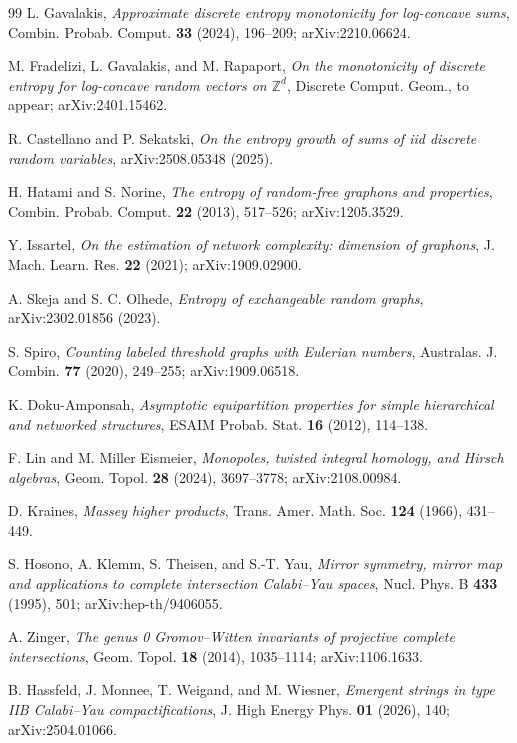 \documentclass[11pt]{article}
\theoremstyle{definition}
\begin{document}
\begin{thebibliography}{99}
 L. Gavalakis, \emph{Approximate discrete entropy monotonicity for log-concave sums}, Combin. Probab. Comput. \textbf{33} (2024), 196--209; arXiv:2210.06624.

 M. Fradelizi, L. Gavalakis, and M. Rapaport, \emph{On the monotonicity of discrete entropy for log-concave random vectors on $\mathbb Z^d$}, Discrete Comput. Geom., to appear; arXiv:2401.15462.

 R. Castellano and P. Sekatski, \emph{On the entropy growth of sums of iid discrete random variables}, arXiv:2508.05348 (2025).

 H. Hatami and S. Norine, \emph{The entropy of random-free graphons and properties}, Combin. Probab. Comput. \textbf{22} (2013), 517--526; arXiv:1205.3529.

 Y. Issartel, \emph{On the estimation of network complexity: dimension of graphons}, J. Mach. Learn. Res. \textbf{22} (2021); arXiv:1909.02900.

 A. Skeja and S. C. Olhede, \emph{Entropy of exchangeable random graphs}, arXiv:2302.01856 (2023).

 S. Spiro, \emph{Counting labeled threshold graphs with Eulerian numbers}, Australas. J. Combin. \textbf{77} (2020), 249--255; arXiv:1909.06518.

 K. Doku-Amponsah, \emph{Asymptotic equipartition properties for simple hierarchical and networked structures}, ESAIM Probab. Stat. \textbf{16} (2012), 114--138.

 F. Lin and M. Miller Eismeier, \emph{Monopoles, twisted integral homology, and Hirsch algebras}, Geom. Topol. \textbf{28} (2024), 3697--3778; arXiv:2108.00984.

 D. Kraines, \emph{Massey higher products}, Trans. Amer. Math. Soc. \textbf{124} (1966), 431--449.

 S. Hosono, A. Klemm, S. Theisen, and S.-T. Yau, \emph{Mirror symmetry, mirror map and applications to complete intersection Calabi--Yau spaces}, Nucl. Phys. B \textbf{433} (1995), 501; arXiv:hep-th/9406055.

 A. Zinger, \emph{The genus 0 Gromov--Witten invariants of projective complete intersections}, Geom. Topol. \textbf{18} (2014), 1035--1114; arXiv:1106.1633.

 B. Hassfeld, J. Monnee, T. Weigand, and M. Wiesner, \emph{Emergent strings in type IIB Calabi--Yau compactifications}, J. High Energy Phys. \textbf{01} (2026), 140; arXiv:2504.01066.


\end{thebibliography}
\end{document}
